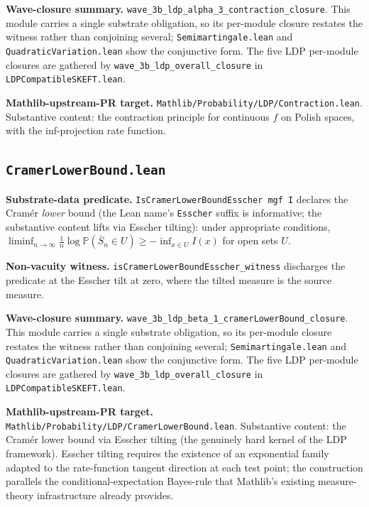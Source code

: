 \documentclass[11pt]{article}
\begin{document}
\textbf{Wave-closure summary.}
\texttt{wave\_3b\_ldp\_alpha\_3\_contraction\_closure}. This module carries a single substrate obligation, so
its per-module closure restates the witness rather than conjoining
several; \texttt{Semimartingale.lean} and
\texttt{QuadraticVariation.lean} show the conjunctive form. The five
LDP per-module closures are gathered by
\texttt{wave\_3b\_ldp\_overall\_closure} in
\texttt{LDPCompatibleSKEFT.lean}.

\textbf{Mathlib-upstream-PR target.}
\texttt{Mathlib/Probability/LDP/Contraction.lean}.
Substantive content: the contraction principle for continuous
$f$ on Polish spaces, with the inf-projection rate function.

\subsection{\texttt{CramerLowerBound.lean}}

\textbf{Substrate-data predicate.}
\texttt{IsCramerLowerBoundEsscher mgf I} declares the Cram\'er
\emph{lower} bound (the Lean name's \texttt{Esscher} suffix is
informative; the substantive content lifts via Esscher tilting):
under appropriate conditions,
$\liminf_{n\to\infty} \frac{1}{n} \log \mathbb{P}(\bar S_n \in U)
\geq -\inf_{x \in U} I(x)$ for open sets $U$.

\textbf{Non-vacuity witness.}
\texttt{isCramerLowerBoundEsscher\_witness} discharges the predicate at the Esscher tilt at zero, where the tilted measure is the source measure.

\textbf{Wave-closure summary.}
\texttt{wave\_3b\_ldp\_beta\_1\_cramerLowerBound\_closure}. This module carries a single substrate obligation, so
its per-module closure restates the witness rather than conjoining
several; \texttt{Semimartingale.lean} and
\texttt{QuadraticVariation.lean} show the conjunctive form. The five
LDP per-module closures are gathered by
\texttt{wave\_3b\_ldp\_overall\_closure} in
\texttt{LDPCompatibleSKEFT.lean}.

\textbf{Mathlib-upstream-PR target.}
\texttt{Mathlib/Probability/LDP/CramerLowerBound.lean}.
Substantive content: the Cram\'er lower bound via Esscher tilting
(the genuinely hard kernel of the LDP framework). Esscher
tilting requires the existence of an exponential family adapted to
the rate-function tangent direction at each test point; the
construction parallels the conditional-expectation Bayes-rule that
Mathlib's existing measure-theory infrastructure already provides.
\end{document}

